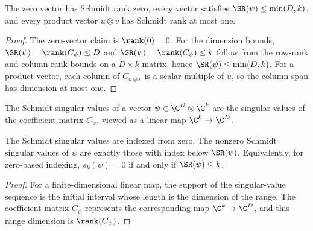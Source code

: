 \begin{theorem}\label{thm:schmidt_rank_basic_bounds}
    \leanok
    The zero vector has Schmidt rank zero, every vector satisfies
    $\SR(\psi)\le \min(D,k)$, and every product vector $u\otimes v$ has
    Schmidt rank at most one.
\end{theorem}

\begin{proof}
    \leanok
    The zero-vector claim is $\rank(0)=0$. For the dimension bounds,
    $\SR(\psi)=\rank(C_\psi)\le D$ and
    $\SR(\psi)=\rank(C_\psi)\le k$ follow from the row-rank and
    column-rank bounds on a $D\times k$ matrix, hence
    $\SR(\psi)\le \min(D,k)$. For a product vector, each column
    of $C_{u\otimes v}$ is a scalar multiple of $u$, so the column span has
    dimension at most one.
\end{proof}

\begin{definition}\label{def:schmidt_singular_values}
    \leanok
    The Schmidt singular values of a vector
    $\psi\in\C^{D}\otimes\C^k$ are the singular values of the coefficient
    matrix $C_\psi$, viewed as a linear map $\C^k\to\C^D$.
\end{definition}

\begin{theorem}
    \label{thm:schmidt_singular_values_support}
    \leanok
    The Schmidt singular values are indexed from zero. The nonzero Schmidt
    singular values of $\psi$ are exactly those with index below
    $\SR(\psi)$. Equivalently, for zero-based indexing,
    $s_k(\psi)=0$ if and only if $\SR(\psi)\le k$.
\end{theorem}

\begin{proof}
    \leanok
    For a finite-dimensional linear map, the support of the singular-value
    sequence is the initial interval whose length is the dimension of the
    range. The coefficient matrix $C_\psi$ represents the corresponding map
    $\C^k\to\C^D$, and this range dimension is $\rank(C_\psi)$.
\end{proof}

